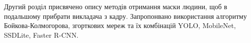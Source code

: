 Другий розділ присвячено опису методів отримання маски людини, 
щоб в подальшому прибрати викладача з кадру. Запропонвано використання
алгоритму Бойкова-Колмогорова, згорткових мереж та їх комбінацій
YOLO, MobileNet, SSDLite, Faster R-CNN.